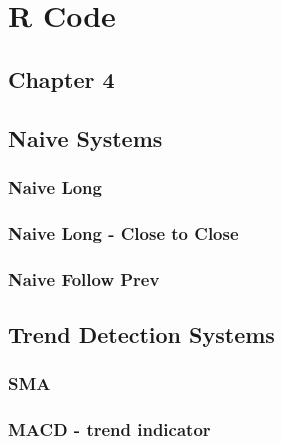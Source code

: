 
\chapter{R Code} %

\label{AppendixA} %

\section{Chapter 4}

\section{Naive Systems}
\subsection{Naive Long}
\label{appA:NaiveLong}


\subsection{Naive Long - Close to Close}
\label{appA:NaiveLong_2}


\subsection{Naive Follow Prev}
\label{appA:NaiveFollowPrev}


\section{Trend Detection Systems}
\subsection{SMA}
\label{appA:SMA_sys}



\subsection{MACD - trend indicator}


\label{appA:macd_xo}

